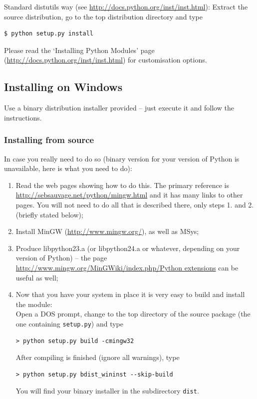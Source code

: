 \documentclass[11pt]{article}
\begin{document}
Standard distutils way (see \url{http://docs.python.org/inst/inst.html}): Extract the source distribution, go to the top distribution directory and type
\begin{verbatim}
$ python setup.py install
\end{verbatim}
Please read the `Installing Python Modules' page (\url{http://docs.python.org/inst/inst.html}) for 
customisation options.

\subsection{Installing on Windows}

Use a binary distribution installer provided -- just execute it and follow the instructions.

\subsubsection{Installing from source}

In case you really need to do so (binary version for your version of Python is unavailable, here is what you need to do):
\begin{enumerate}
\item Read the web pages showing how to do this. The primary reference is \url{http://sebsauvage.net/python/mingw.html} and it has many links to other pages. You will not need to do all that is described there, only steps 1. and 2. (briefly stated below);
\item Install MinGW (\url{http://www.mingw.org/}), as well as MSys;
\item Produce libpython23.a (or libpython24.a or whatever, depending on your version of Python) -- the page \url{http://www.mingw.org/MinGWiki/index.php/Python extensions} can be useful as well;
\item Now that you have your system in place it is very easy to build and install the module:\\
Open a DOS prompt, change to the top directory of the source package (the one containing \texttt{setup.py})
and type
\begin{verbatim}
> python setup.py build -cmingw32
\end{verbatim}
After compiling is finished (ignore all warnings), type
\begin{verbatim}
> python setup.py bdist_wininst --skip-build
\end{verbatim}
You will find your binary installer in the subdirectory \texttt{dist}.
\end{enumerate}
\end{document}

